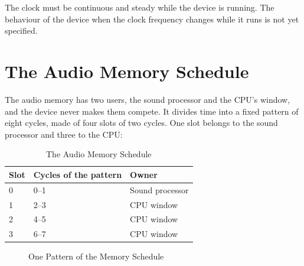 The clock must be continuous and steady while the device is running. The behaviour of the device when the clock
frequency changes while it runs is not yet specified.

\section{The Audio Memory Schedule}
\label{sec:memory-schedule}

The audio memory has two users, the sound processor and the CPU's window, and the device never makes them compete. It
divides time into a fixed pattern of eight cycles, made of four slots of two cycles. One slot belongs to the sound
processor and three to the CPU:

\begin{table}[H]
	\centering
	\begin{tabular}{lll}
		\toprule
		\textbf{Slot} & \textbf{Cycles of the pattern} & \textbf{Owner}  \\
		\midrule
		0             & 0--1                           & Sound processor \\
		1             & 2--3                           & CPU window      \\
		2             & 4--5                           & CPU window      \\
		3             & 6--7                           & CPU window      \\
		\bottomrule
	\end{tabular}
	\caption{The Audio Memory Schedule}
	\label{tab:memory-schedule}
\end{table}

\begin{figure}[H]
	\centering
	\caption{One Pattern of the Memory Schedule}
	\label{fig:memory-schedule}
\end{figure}

